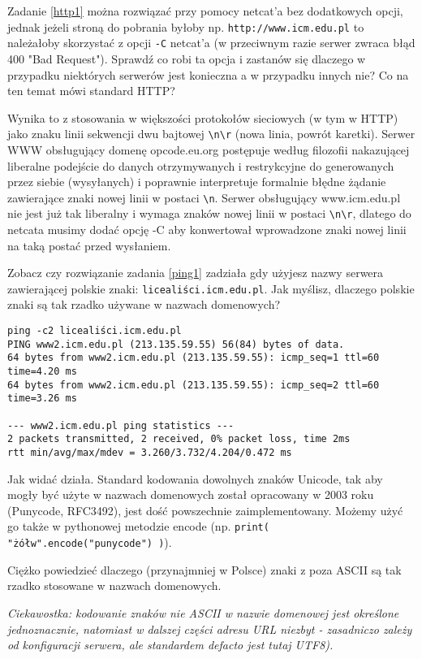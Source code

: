 \dbEntryCheckResults
Zadanie \ref{http1} można rozwiązać przy pomocy netcat'a bez dodatkowych opcji, jednak jeżeli stroną do pobrania byłoby np. \Verb#http://www.icm.edu.pl# to należałoby skorzystać z opcji \Verb#-C# netcat'a (w przeciwnym razie serwer zwraca błąd 400 "Bad Request").
Sprawdź co robi ta opcja i zastanów się dlaczego w przypadku niektórych serwerów jest konieczna a w przypadku innych nie? Co na ten temat mówi standard HTTP?
\fi

\dbEntryCheckResults
Wynika to z stosowania w większości protokołów sieciowych (w tym w HTTP) jako znaku linii sekwencji dwu bajtowej \Verb#\n\r# (nowa linia, powrót karetki).
Serwer WWW obsługujący domenę opcode.eu.org postępuje według filozofii nakazującej liberalne podejście do danych otrzymywanych i restrykcyjne do generowanych przez siebie (wysyłanych) i poprawnie interpretuje formalnie błędne żądanie zawierające znaki nowej linii w postaci \Verb#\n#.
Serwer obsługujący www.icm.edu.pl nie jest już tak liberalny i wymaga znaków nowej linii w postaci \Verb#\n\r#, dlatego do netcata musimy dodać opcję -C aby konwertował wprowadzone znaki nowej linii na taką postać przed wysłaniem.
\fi

\dbEntryCheckResults
Zobacz czy rozwiązanie zadania \ref{ping1} zadziała gdy użyjesz nazwy serwera zawierającej polskie znaki: \Verb#licealiści.icm.edu.pl#.
Jak myślisz, dlaczego polskie znaki są tak rzadko używane w nazwach domenowych?
\fi
{}\dbEntryCheckResults
\begin{Verbatim}
ping -c2 licealiści.icm.edu.pl
PING www2.icm.edu.pl (213.135.59.55) 56(84) bytes of data.
64 bytes from www2.icm.edu.pl (213.135.59.55): icmp_seq=1 ttl=60 time=4.20 ms
64 bytes from www2.icm.edu.pl (213.135.59.55): icmp_seq=2 ttl=60 time=3.26 ms

--- www2.icm.edu.pl ping statistics ---
2 packets transmitted, 2 received, 0% packet loss, time 2ms
rtt min/avg/max/mdev = 3.260/3.732/4.204/0.472 ms
\end{Verbatim}
Jak widać działa. Standard kodowania dowolnych znaków Unicode, tak aby mogły być użyte w nazwach domenowych został opracowany w 2003 roku (Punycode, RFC3492), jest dość powszechnie zaimplementowany.
Możemy użyć go także w pythonowej metodzie encode (np. \Verb#print( "żółw".encode("punycode") )#).

Ciężko powiedzieć dlaczego (przynajmniej w Polsce) znaki z poza ASCII są tak rzadko stosowane w nazwach domenowych.

\textit{Ciekawostka: kodowanie znaków nie ASCII w nazwie domenowej jest określone jednoznacznie, natomiast w dalszej części adresu URL niezbyt - zasadniczo zależy od konfiguracji serwera, ale standardem defacto jest tutaj UTF8).}
\fi
